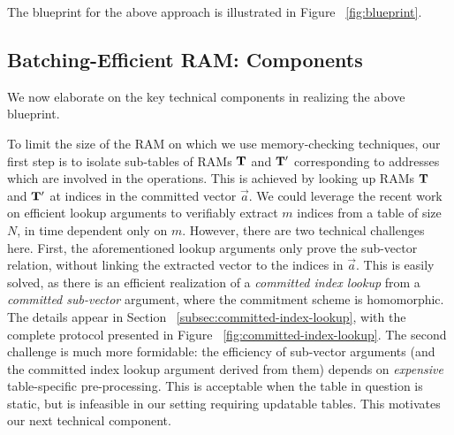 The blueprint for the above approach is illustrated in Figure ~\ref{fig:blueprint}.

\subsection{Batching-Efficient RAM: Components}\label{subsec:batching-efficient-ram-components}
We now elaborate on the key technical components in realizing the above blueprint.

\medskip

 To limit the size of the RAM on which we use memory-checking techniques,
our first step is to isolate sub-tables of RAMs $\mathbf{T}$ and
$\mathbf{T}'$ corresponding to addresses which are involved in the operations.
This is achieved by looking up RAMs $\mathbf{T}$ and
$\mathbf{T}'$ at indices in the committed vector $\vec{a}$. We could leverage the recent work on efficient lookup
arguments to verifiably extract $m$ indices from a table of size $N$, in time dependent only on $m$.
However, there are two technical challenges here. First, the aforementioned lookup arguments only prove the sub-vector
relation, without linking the extracted vector to the indices in $\vec{a}$. This is easily solved, as there
is an efficient realization of a {\em committed index lookup} from a {\em committed sub-vector} argument,
where the commitment scheme is homomorphic. The details appear in Section ~\ref{subsec:committed-index-lookup},
with the complete protocol presented in Figure ~\ref{fig:committed-index-lookup}. The second challenge is much more
formidable: the efficiency of sub-vector arguments (and the committed index lookup argument derived from them)
depends on {\em expensive} table-specific pre-processing. This is acceptable when the table in question is
static, but is infeasible in our setting requiring updatable tables. This motivates our next technical
component.

\medskip


